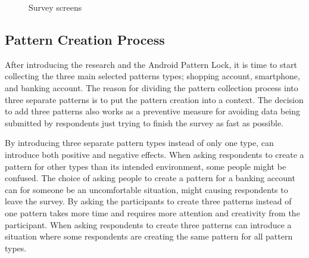 \begin{figure}[H]
{          \label{fig:ALPintroduction}
        }
        \caption{Survey screens}
        \label{fig:introductionviews}
      \end{figure}

    \subsection{Pattern Creation Process}
    After introducing the research and the Android Pattern Lock,  it is time to start collecting the three main selected patterns types; shopping account, smartphone, and banking account. The reason for dividing the pattern collection process into three separate patterns is to put the pattern creation into a context. The decision to add three patterns also works as a preventive measure for avoiding data being submitted by respondents just trying to finish the survey as fast as possible. 

    By introducing three separate pattern types instead of only one type, can introduce both positive and negative effects. When asking respondents to create a pattern for other types than its intended environment, some people might be confused. The choice of asking people to create a pattern for a banking account can for someone be an uncomfortable situation, might causing respondents to leave the survey. By asking the participants to create three patterns instead of one pattern takes more time and requires more attention and creativity from the participant. When asking respondents to create three patterns can introduce a situation where some respondents are creating the same pattern for all pattern types. 


